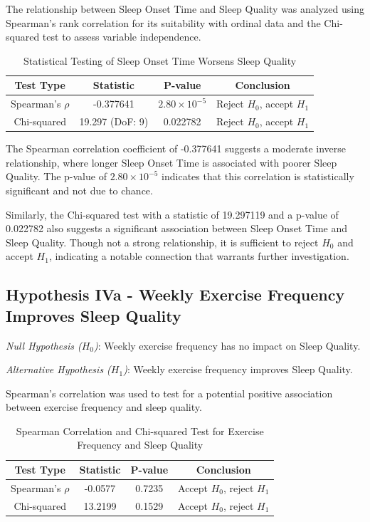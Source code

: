 \documentclass[conference]{IEEEtran}
\begin{document}
The relationship between Sleep Onset Time and Sleep Quality was analyzed using Spearman's rank correlation for its suitability with ordinal data and the Chi-squared test to assess variable independence.

\begin{table}[ht]
\centering
\caption{Statistical Testing of Sleep Onset Time Worsens Sleep Quality}
\label{tab:hypothesis3}
\begin{tabular}{|c|c|c|c|}
\hline
\textbf{Test Type} & \textbf{Statistic} & \textbf{P-value} & \textbf{Conclusion} \\
\hline
Spearman's \(\rho\) & -0.377641 & \(2.80 \times 10^{-5}\) & Reject \(H_0\), accept \(H_1\) \\
\hline
Chi-squared & 19.297 (DoF: 9) & 0.022782 & Reject \(H_0\), accept \(H_1\) \\
\hline
\end{tabular}
\end{table}

The Spearman correlation coefficient of -0.377641 suggests a moderate inverse relationship, where longer Sleep Onset Time is associated with poorer Sleep Quality. The p-value of \(2.80 \times 10^{-5}\) indicates that this correlation is statistically significant and not due to chance.

Similarly, the Chi-squared test with a statistic of 19.297119 and a p-value of 0.022782 also suggests a significant association between Sleep Onset Time and Sleep Quality. Though not a strong relationship, it is sufficient to reject \(H_0\) and accept \(H_1\), indicating a notable connection that warrants further investigation.


\subsection*{Hypothesis IVa - Weekly Exercise Frequency Improves Sleep Quality}
\textit{Null Hypothesis (\(H_0\))}: Weekly exercise frequency has no impact on Sleep Quality.

\textit{Alternative Hypothesis (\(H_1\))}: Weekly exercise frequency improves Sleep Quality.

Spearman's correlation was used to test for a potential positive association between exercise frequency and sleep quality.

\begin{table}[ht]
    \centering
    \caption{Spearman Correlation and Chi-squared Test for Exercise Frequency and Sleep Quality}
    \label{tab:hypothesis4a}
    \begin{tabular}{|c|c|c|c|}
    \hline
    \textbf{Test Type} & \textbf{Statistic} & \textbf{P-value} & \textbf{Conclusion} \\
    \hline
    Spearman's \(\rho\) & -0.0577 & 0.7235 & Accept \(H_0\), reject \(H_1\) \\
    \hline
    Chi-squared & 13.2199 & 0.1529 & Accept \(H_0\), reject \(H_1\) \\
    \hline
    \end{tabular}
    \end{table}
\end{document}
